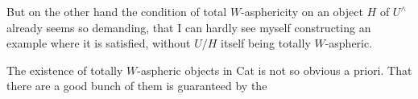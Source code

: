 But on the other hand the condition of total $W$-asphericity on an object $H$ of $U^{\wedge}$ already seems so demanding, that I can hardly see myself constructing an example where it is satisfied, without $U/H$ itself being totally $W$-aspheric.

The existence of totally $W$-aspheric objects in Cat is not so obvious a priori. That there are a good bunch of them is guaranteed by the
